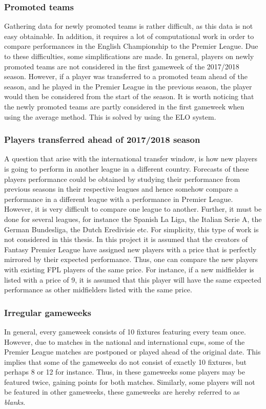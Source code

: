 \subsubsection{Promoted teams}
Gathering data for newly promoted teams is rather difficult, as this data is not easy obtainable. In addition, it requires a lot of computational work in order to compare performances in the English Championship to the Premier League. Due to these difficulties, some simplifications are made. In general, players on newly promoted teams are not considered in the first gameweek of the 2017/2018 season. However, if a player was transferred to a promoted team ahead of the season, and he played in the Premier League in the previous season, the player would then be considered from the start of the season. It is worth noticing that the newly promoted teams are partly considered in the first gameweek when using the average method. This is solved by using the ELO system. 
\subsubsection{Players transferred ahead of 2017/2018 season}
A question that arise with the international transfer window, is how new players is going to perform in another league in a different country. Forecasts of these players performance could be obtained by studying their performance from previous seasons in their respective leagues and hence somehow compare a performance in a different league with a performance in Premier League. However, it is very difficult to compare one league to another. Further, it must be done for several leagues, for instance the Spanish La Liga, the Italian Serie A, the German Bundesliga, the Dutch Eredivisie etc. For simplicity, this type of work is not considered in this thesis.
\newpar
In this project it is assumed that the creators of Fantasy Premier League have assigned new players with a price that is perfectly mirrored by their expected performance. Thus, one can compare the new players with existing FPL players of the same price. For instance, if a new midfielder is listed with a price of 9, it is assumed that this player will have the same expected performance as other midfielders listed with the same price.
\subsubsection{Irregular gameweeks}
In general, every gameweek consists of 10 fixtures featuring every team once. However, due to matches in the national and international cups, some of the Premier League matches are postponed or played ahead of the original date. This implies that some of the gameweeks do not consist of exactly 10 fixtures, but perhaps 8 or 12 for instance. Thus, in these gameweeks some players may be featured twice, gaining points for both matches. Similarly, some players will not be featured in other gameweeks, these gameweeks are hereby referred to as \textit{blanks}.

